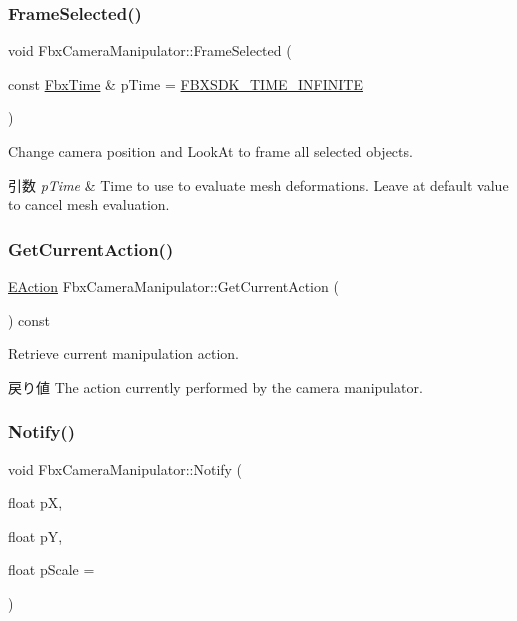 \subsubsection{\texorpdfstring{Frame\+Selected()}{FrameSelected()}}
{\footnotesize\ttfamily void Fbx\+Camera\+Manipulator\+::\+Frame\+Selected (\begin{DoxyParamCaption}\item[{const \hyperlink{class_fbx_time}{Fbx\+Time} \&}]{p\+Time = {\ttfamily \hyperlink{fbxtime_8h_a1e6db3fe0f84f0b7daa775739f93526f}{F\+B\+X\+S\+D\+K\+\_\+\+T\+I\+M\+E\+\_\+\+I\+N\+F\+I\+N\+I\+TE}} }\end{DoxyParamCaption})}

Change camera position and Look\+At to frame all selected objects. 
\begin{DoxyParams}{引数}
{\em p\+Time} & Time to use to evaluate mesh deformations. Leave at default value to cancel mesh evaluation. \\
\hline
\end{DoxyParams}
\mbox{\label{class_fbx_camera_manipulator_a93f3cd6487e8f10c9accb6db1022e397}} 
\subsubsection{\texorpdfstring{Get\+Current\+Action()}{GetCurrentAction()}}
{\footnotesize\ttfamily \hyperlink{class_fbx_camera_manipulator_ada0f93888edb4a1c0140e35f99eba922}{E\+Action} Fbx\+Camera\+Manipulator\+::\+Get\+Current\+Action (\begin{DoxyParamCaption}{ }\end{DoxyParamCaption}) const}

Retrieve current manipulation action. \begin{DoxyReturn}{戻り値}
The action currently performed by the camera manipulator. 
\end{DoxyReturn}
\mbox{\label{class_fbx_camera_manipulator_af9008a220ef4a6ececcf46bb171656b4}} 
\subsubsection{\texorpdfstring{Notify()}{Notify()}}
{\footnotesize\ttfamily void Fbx\+Camera\+Manipulator\+::\+Notify (\begin{DoxyParamCaption}\item[{float}]{pX,  }\item[{float}]{pY,  }\item[{float}]{p\+Scale = {} }\end{DoxyParamCaption})}

